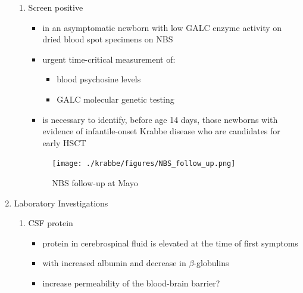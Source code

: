 \documentclass{scrartcl}
\begin{document}
\begin{enumerate}
\begin{enumerate}
\item Screen positive
\label{sec:org254b956}
\begin{itemize}
\item in an asymptomatic newborn with low GALC enzyme activity
on dried blood spot specimens on NBS
\item urgent time-critical measurement of:
\begin{itemize}
\item blood psychosine levels
\item GALC molecular genetic testing
\end{itemize}
\item is necessary to identify, before age 14 days, those newborns with
evidence of infantile-onset Krabbe disease who are candidates for
early HSCT
\end{itemize}

\begin{figure}[htbp]
\centering
\texttt{[image: ./krabbe/figures/NBS\_follow\_up.png]}
\caption{\label{fig:org1b969f0}
NBS follow-up at Mayo}
\end{figure}
\end{enumerate}

\item Laboratory Investigations
\label{sec:orgbdde64c}
\begin{enumerate}
\item CSF protein
\label{sec:org395e28e}
\begin{itemize}
\item protein in cerebrospinal fluid is elevated at the time of first symptoms
\item with increased albumin and decrease in \(\beta\)-globulins
\item increase permeability of the blood-brain barrier?
\end{itemize}


\end{enumerate}
\end{enumerate}
\end{document}

